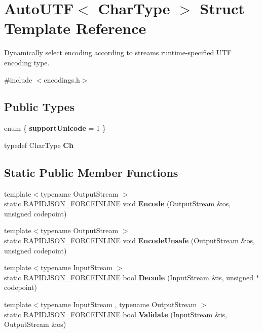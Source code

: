 \hypertarget{a02176}{}\section{Auto\+U\+TF$<$ Char\+Type $>$ Struct Template Reference}
\label{a02176}


Dynamically select encoding according to stream\textquotesingle{}s runtime-\/specified U\+TF encoding type.  




{\ttfamily \#include $<$encodings.\+h$>$}

\subsection*{Public Types}
\begin{DoxyCompactItemize}
\item 
\mbox{\label{a02176_aacfa2cfd9ad903c9c7110803c4037a7d}} 
enum \{ {\bfseries support\+Unicode} = 1
 \}
\item 
\mbox{\label{a02176_a0609343de776df3bc31b4c980eb3cf1c}} 
typedef Char\+Type {\bfseries Ch}
\end{DoxyCompactItemize}
\subsection*{Static Public Member Functions}
\begin{DoxyCompactItemize}
\item 
\mbox{\label{a02176_a414946115261f886e74dd42cb4b98781}} 
{\footnotesize template$<$typename Output\+Stream $>$ }\\static R\+A\+P\+I\+D\+J\+S\+O\+N\+\_\+\+F\+O\+R\+C\+E\+I\+N\+L\+I\+NE void {\bfseries Encode} (Output\+Stream \&os, unsigned codepoint)
\item 
\mbox{\label{a02176_a05f5dcd1f153b61b763e44ed452de251}} 
{\footnotesize template$<$typename Output\+Stream $>$ }\\static R\+A\+P\+I\+D\+J\+S\+O\+N\+\_\+\+F\+O\+R\+C\+E\+I\+N\+L\+I\+NE void {\bfseries Encode\+Unsafe} (Output\+Stream \&os, unsigned codepoint)
\item 
\mbox{\label{a02176_aa5e3c1dc23dbb75f6442ff69500a35b0}} 
{\footnotesize template$<$typename Input\+Stream $>$ }\\static R\+A\+P\+I\+D\+J\+S\+O\+N\+\_\+\+F\+O\+R\+C\+E\+I\+N\+L\+I\+NE bool {\bfseries Decode} (Input\+Stream \&is, unsigned $\ast$codepoint)
\item 
\mbox{\label{a02176_a36dd6f226d6a07c12161e21c0aff20b1}} 
{\footnotesize template$<$typename Input\+Stream , typename Output\+Stream $>$ }\\static R\+A\+P\+I\+D\+J\+S\+O\+N\+\_\+\+F\+O\+R\+C\+E\+I\+N\+L\+I\+NE bool {\bfseries Validate} (Input\+Stream \&is, Output\+Stream \&os)
\end{DoxyCompactItemize}


